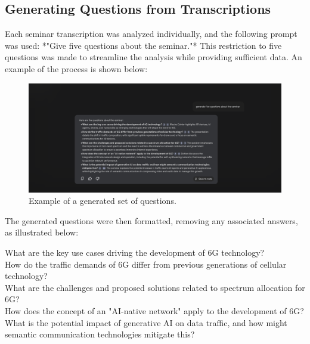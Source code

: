 \subsection{Generating Questions from Transcriptions}
Each seminar transcription was analyzed individually, and the following prompt was used: *"Give five questions about the seminar."* This restriction to five questions was made to streamline the analysis while providing sufficient data. An example of the process is shown below:
\begin{figure}[H]
    \centering
    \includegraphics[scale=0.35]{Imagens/question.png}
    \caption{Example of a generated set of questions.}
\end{figure}
The generated questions were then formatted, removing any associated answers, as illustrated below:
\begin{tcolorbox}
What are the key use cases driving the development of 6G technology?\\
How do the traffic demands of 6G differ from previous generations of cellular technology?\\
What are the challenges and proposed solutions related to spectrum allocation for 6G?\\
How does the concept of an "AI-native network" apply to the development of 6G?\\
What is the potential impact of generative AI on data traffic, and how might semantic communication technologies mitigate this?\\
\end{tcolorbox}

